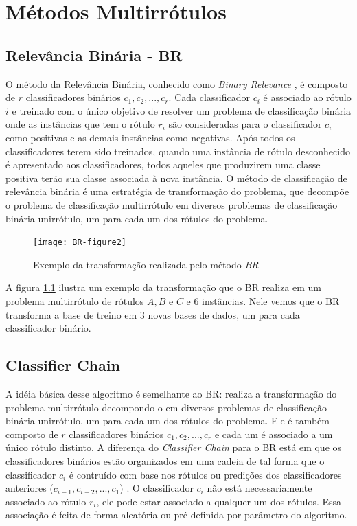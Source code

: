 \chapter{Métodos Multirrótulos}
\section{Relevância Binária - BR}
\label{sec:br}


O método da Relevância Binária, conhecido como \textit{Binary Relevance} \cite{br2010}, 
é composto de $r$ classificadores binários $c_1,c_2,...,c_r$. Cada classificador $c_i$ 
é associado ao rótulo $i$ e treinado com o único objetivo de resolver
um problema de classificação binária onde as instâncias que
tem o rótulo $r_i$ são consideradas para o classificador $c_i$ como positivas
e as demais instâncias como
negativas. 
Após todos os classificadores terem sido treinados, quando uma instância
de rótulo desconhecido 
é apresentado aos classificadores, todos aqueles que produzirem uma classe positiva
terão sua classe associada à nova instância.
O método de classificação de relevância binária é uma estratégia de transformação do
problema, que decompõe o problema de classificação multirrótulo em diversos problemas
de classificação binária unirrótulo, um para cada um dos rótulos do problema.

\begin{figure}
 \texttt{[image: BR-figure2]}
 
 \caption{Exemplo da transformação realizada pelo método \textit{BR}}
\label{fig:br}

\end{figure}

A figura \ref{fig:br} ilustra um exemplo da transformação que o BR realiza em um problema multirrótulo
de rótulos $A,B$ e $C$ e 6 instâncias. Nele vemos que o BR transforma a base de treino em 3 novas bases
de dados, um para cada classificador binário.


\FloatBarrier


\section{Classifier Chain}


A idéia básica desse algoritmo é semelhante ao BR: realiza a transformação do
problema multirrótulo decompondo-o em diversos problemas
de classificação binária unirrótulo, um para cada um dos rótulos do problema.
Ele é também composto de $r$ classificadores binários $c_1,c_2,...,c_r$ e cada um
é associado a um único rótulo distinto. A diferença do \textit{Classifier Chain} para o BR está
em que os classificadores binários estão organizados em uma cadeia de tal forma que
o classificador $c_i$ é contruído com base nos rótulos ou predições dos classificadores anteriores
($c_{i-1},c_{i-2},...,c_{1}$) \cite{cc2009}. O classificador $c_i$ não está necessariamente associado ao rótulo $r_i$,
ele pode estar associado a qualquer um dos rótulos.
Essa associação é feita de forma aleatória ou pré-definida por parâmetro do algoritmo.

